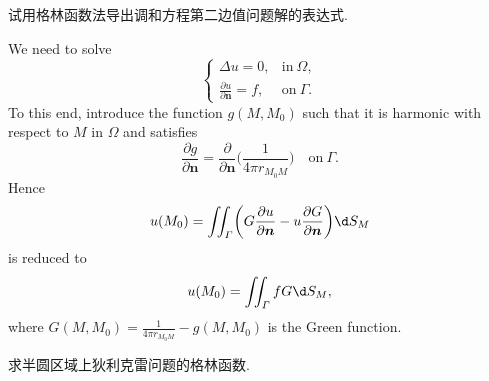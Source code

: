 \begin{exercise}
  试用格林函数法导出调和方程第二边值问题解的表达式.
\end{exercise}

\begin{solution}
  We need to solve 
  \[\begin{cases}
    \Delta u = 0, & \text{in}\ \varOmega, \\
    \displaystyle\frac{\partial u}{\partial\bm{n}} = f, & \text{on}\ \varGamma.
  \end{cases}\]
  To this end, introduce the function $g(M,M_0)$
  such that it is harmonic with respect to $M$ in $\varOmega$ and satisfies
  \[ \frac{\partial g}{\partial\bm{n}}
    = \frac{\partial}{\partial\bm{n}} \biggl(\frac{1}{4\pi r_{M_0M}}\biggr)
    \quad\text{on}\ \varGamma. \]
  Hence
  \[ u(M_0) = \iint_\varGamma \biggl(G\frac{\partial u}{\partial\bm{n}}
      - u \frac{\partial G}{\partial\bm{n}}\biggr) \d S_M \]
  is reduced to
  \[ u(M_0) = \iint_\varGamma fG \d S_M, \]
  where $\displaystyle G(M,M_0) = \frac{1}{4\pi r_{M_0M}} - g(M,M_0)$ is the Green function.
\end{solution}


\begin{exercise}
  求半圆区域上狄利克雷问题的格林函数.
\end{exercise}

